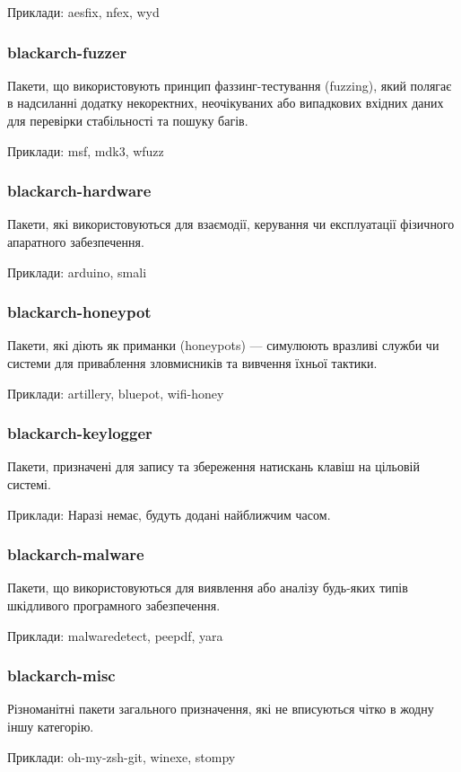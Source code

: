 \documentclass[a4paper, oneside, 11pt]{book}
\begin{document}
Приклади: aesfix, nfex, wyd

\subsubsection{blackarch-fuzzer}
Пакети, що використовують принцип фаззинг-тестування (fuzzing), який полягає в надсиланні додатку некоректних, неочікуваних або випадкових вхідних даних для перевірки стабільності та пошуку багів.

Приклади: msf, mdk3, wfuzz

\subsubsection{blackarch-hardware}
Пакети, які використовуються для взаємодії, керування чи експлуатації фізичного апаратного забезпечення.

Приклади: arduino, smali

\subsubsection{blackarch-honeypot}
Пакети, які діють як приманки (honeypots) --- симулюють вразливі служби чи системи для приваблення зловмисників та вивчення їхньої тактики.

Приклади: artillery, bluepot, wifi-honey

\subsubsection{blackarch-keylogger}
Пакети, призначені для запису та збереження натискань клавіш на цільовій системі.

Приклади: Наразі немає, будуть додані найближчим часом.

\subsubsection{blackarch-malware}
Пакети, що використовуються для виявлення або аналізу будь-яких типів шкідливого програмного забезпечення.

Приклади: malwaredetect, peepdf, yara

\subsubsection{blackarch-misc}
Різноманітні пакети загального призначення, які не вписуються чітко в жодну іншу категорію.

Приклади: oh-my-zsh-git, winexe, stompy
\end{document}
